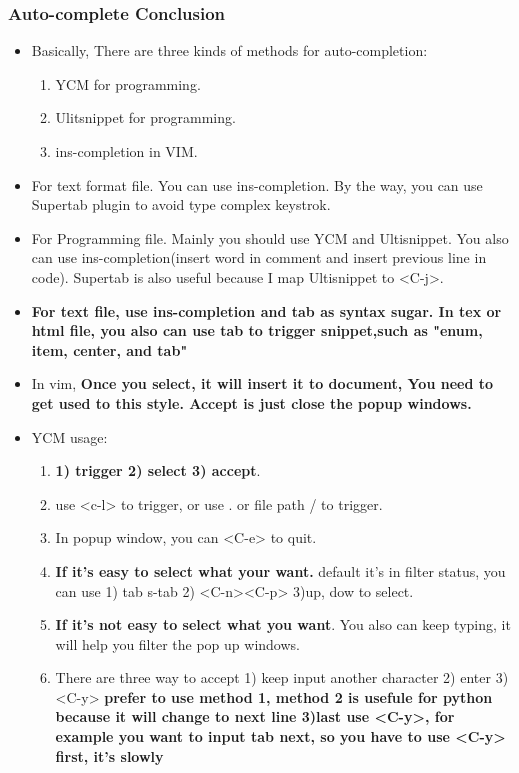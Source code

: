 \documentclass[a4paper,12pt,twoside]{book}
\begin{document}
\subsubsection{Auto-complete Conclusion}

\begin{itemize}
		\item Basically, There are three kinds of methods for auto-completion:
				\begin{enumerate}
						\item YCM for programming.
						\item Ulitsnippet for programming.
						\item ins-completion in VIM.
				\end{enumerate}
		\item For text format file. You can use ins-completion. By the way, you can use Supertab plugin to avoid type complex keystrok. 

		\item For Programming file. Mainly you should use YCM and Ultisnippet. You also can use ins-completion(insert word in comment and insert previous line in code). Supertab is also useful because I map Ultisnippet to <C-j>.

		\item \textbf{For text file, use ins-completion and tab as syntax sugar. In tex or html file, you also can use tab to trigger snippet,such as "enum, item, center, and tab"}

		\item In vim, \textbf{Once you select, it will insert it to document, You need to get used to this style. Accept is just close the popup windows.}

		\item YCM usage:
				\begin{enumerate}
						\item \textbf{1) trigger 2) select 3) accept}.
						\item use <c-l> to trigger, or use . or file path / to trigger.
						\item In popup window, you can <C-e> to quit.
						\item \textbf{If it's easy to select what your want.} default it's in filter status, you can use 1) tab s-tab 2) <C-n><C-p> 3)up, dow to select.
						\item \textbf{If it's not easy to select what you want}. You also can keep typing, it will help you filter the pop up windows.
						\item There are three way to accept 1) keep input another character 2) enter 3) <C-y> \textbf{prefer to use method 1, method 2 is usefule for python because it will change to next line 3)last use <C-y>, for example you want to input tab next, so you have to use <C-y> first, it's slowly}
				\end{enumerate}


\end{itemize}
\end{document}
